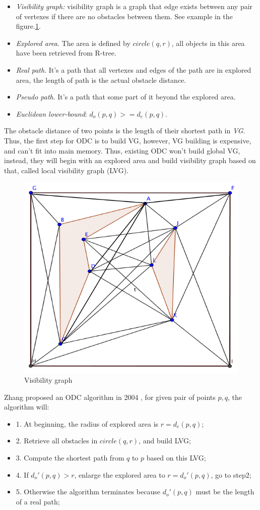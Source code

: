 \begin{itemize}
  \item \textit{Visibility graph:} visibility graph is a graph that edge exists between any pair of
vertexes if there are no obstacles between them. See example in the figure.\ref{vg}.
  \item \textit{Explored area}. The area is defined by $circle(q, r)$, all objects in this area
    have been retrieved from R-tree.
  \item \textit{Real path}. It's a path that all vertexes and edges of the path are in explored
    area, the length of path is the actual obstacle distance.
  \item \textit{Pseudo path}. It's a path that some part of it beyond the explored area.
  \item \textit{Euclidean lower-bound}: $d_o(p, q) >= d_e(p, q)$.
\end{itemize}

The obstacle distance of two points is the length of their shortest path in \textit{VG}.
Thus, the first step for ODC is to build VG, however, VG building is expensive, and can't fit
into main memory. Thus, existing ODC won't build global VG, instead, they will begin with
an explored area and build visibility graph based on that, called local visibility graph (LVG).

\begin{figure}[htp]
  \centering
  \includegraphics[width=.5\linewidth]{pic/vg.png}
  \caption{Visibility graph}
  \label{vg}
\end{figure}

Zhang proposed an ODC algorithm in 2004 \cite{zhang2004spatial}, for given pair of points
$p,q$, the algorithm will:

\begin{itemize}
  \item 1. At beginning, the radius of explored area is $r=d_e(p,q)$;
  \item 2. Retrieve all obstacles in $circle(q, r)$, and build LVG;
  \item 3. Compute the shortest path from $q$ to $p$ based on this LVG;
  \item 4. If $d_o'(p, q) > r$, enlarge the explored area to $r=d_o'(p, q)$, go to step2;
  \item 5. Otherwise the algorithm terminates because $d_o'(p, q)$ must be the length of a real path;
\end{itemize}

